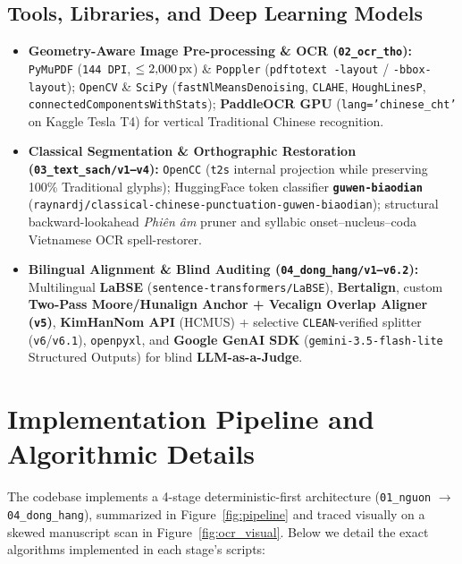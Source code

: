 \documentclass[a4paper]{article}
\begin{document}
\subsection{Tools, Libraries, and Deep Learning Models}
\begin{itemize}
  \item \textbf{Geometry-Aware Image Pre-processing \& OCR (\texttt{02\_ocr\_tho}):} \texttt{PyMuPDF} (\texttt{144\,DPI}, $\le 2{,}000\text{\,px}$) \& \texttt{Poppler} (\texttt{pdftotext -layout} / \texttt{-bbox-layout}); \texttt{OpenCV} \& \texttt{SciPy} (\texttt{fastNlMeansDenoising}, \texttt{CLAHE}, \texttt{HoughLinesP}, \texttt{connectedComponentsWithStats}); \textbf{PaddleOCR GPU} (\texttt{lang='chinese\_cht'} on Kaggle Tesla T4) for vertical Traditional Chinese recognition.
  \item \textbf{Classical Segmentation \& Orthographic Restoration (\texttt{03\_text\_sach/v1--v4}):} \texttt{OpenCC} (\texttt{t2s} internal projection while preserving 100\% Traditional glyphs); HuggingFace token classifier \textbf{\texttt{guwen-biaodian}} (\texttt{raynardj/classical-chinese-punctuation-guwen-biaodian}); structural backward-lookahead \textit{Phiên âm} pruner and syllabic onset--nucleus--coda Vietnamese OCR spell-restorer.
  \item \textbf{Bilingual Alignment \& Blind Auditing (\texttt{04\_dong\_hang/v1--v6.2}):} Multilingual \textbf{LaBSE} (\texttt{sentence-transformers/LaBSE}), \textbf{Bertalign}, custom \textbf{Two-Pass Moore/Hunalign Anchor + Vecalign Overlap Aligner (\texttt{v5})}, \textbf{KimHanNom API} (HCMUS) + selective \texttt{CLEAN}-verified splitter (\texttt{v6}/\texttt{v6.1}), \texttt{openpyxl}, and \textbf{Google GenAI SDK} (\texttt{gemini-3.5-flash-lite} Structured Outputs) for blind \textbf{LLM-as-a-Judge}.
\end{itemize}

\section{Implementation Pipeline and Algorithmic Details}
The codebase implements a 4-stage deterministic-first architecture (\texttt{01\_nguon} $\to$ \texttt{04\_dong\_hang}), summarized in Figure~\ref{fig:pipeline} and traced visually on a skewed manuscript scan in Figure~\ref{fig:ocr_visual}. Below we detail the exact algorithms implemented in each stage's scripts:
\end{document}
